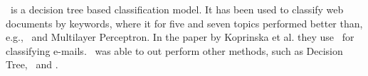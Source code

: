\rf\ is a decision tree based classification model. It has been used to classify web documents by keywords, where it for five and seven topics performed better than, e.g., \nb\ and Multilayer Perceptron. In the paper by Koprinska et al. they use \rf\ for classifying e-mails. \rf\ was able to out perform other methods, such as Decision Tree, \svm\ and \nb. \cite{keywords}\cite{email}